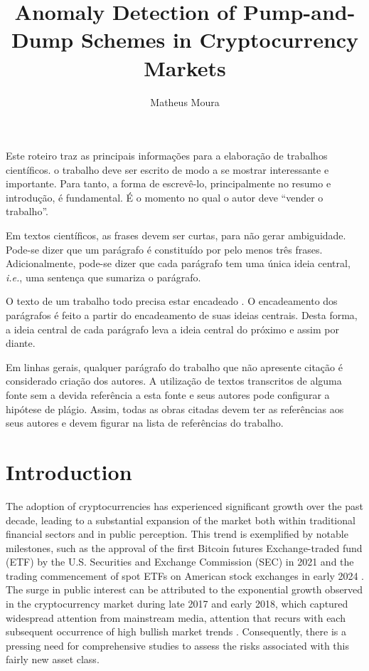 \documentclass[12pt]{article}
\title{Anomaly Detection of Pump-and-Dump Schemes in Cryptocurrency Markets}
\author{Matheus Moura\inst{1}}
\begin{document}
 
	
	\maketitle
	
	\begin{resumo} 
		Este roteiro traz as principais informações para a elaboração de trabalhos científicos. o trabalho deve ser escrito de modo a se mostrar interessante e importante. Para tanto, a forma de escrevê-lo, principalmente no resumo e  introdução, é fundamental. É o momento no qual o autor deve ``vender o trabalho''. 
		
		Em textos científicos, as frases devem ser curtas, para não gerar ambiguidade. Pode-se dizer que um parágrafo é constituído por pelo menos três frases. Adicionalmente, pode-se dizer que cada parágrafo tem uma única ideia central, \emph{i.e.}, uma sentença  que sumariza o parágrafo. 
		
		O texto de um trabalho todo precisa estar encadeado \citep{zobel_writing_2015}. O encadeamento dos parágrafos é feito a partir do encadeamento de suas ideias centrais. Desta forma, a ideia central de cada parágrafo leva a ideia central do próximo e assim por diante. 
		
		Em linhas gerais, qualquer parágrafo do trabalho que não apresente citação é considerado criação dos autores. A utilização de textos transcritos de alguma fonte sem a devida referência a esta fonte e seus autores pode configurar a hipótese de plágio. Assim, todas as obras citadas devem ter as referências aos seus autores e devem figurar na lista de referências do trabalho.
	\end{resumo}
	
	\section{Introduction}
	\label{sec_introducao}

	The adoption of cryptocurrencies has experienced significant growth over the past decade, leading to a substantial expansion of the market both within traditional financial sectors and in public perception.
	This trend is exemplified by notable milestones, such as the approval of the first Bitcoin futures Exchange-traded fund (ETF) by the U.S. Securities and Exchange Commission (SEC) in 2021 \citep{wursthorn2021} and the trading commencement of spot ETFs on American stock exchanges in early 2024 \citep{schmitt2024}.
	The surge in public interest can be attributed to the exponential growth observed in the cryptocurrency market during late 2017 and early 2018, which captured widespread attention from mainstream media, attention that recurs with each subsequent occurrence of high bullish market trends \citep{steinmetz2021}.
	Consequently, there is a pressing need for comprehensive studies to assess the risks associated with this fairly new asset class.
\end{document}
